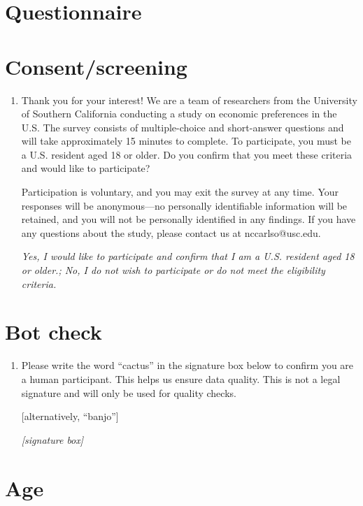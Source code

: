 \documentclass[11pt, headsepline]{article}
\begin{document}
\section*{\centering \LARGE \normalfont Questionnaire}

\section*{Consent/screening}

\begin{enumerate}
    \item Thank you for your interest! We are a team of researchers from the University of Southern California conducting a study on economic preferences in the U.S. 
    The survey consists of multiple-choice and short-answer questions and will take approximately 15 minutes to complete.
    To participate, you must be a U.S. resident aged 18 or older. Do you confirm that you meet these criteria and would like to participate?

    Participation is voluntary, and you may exit the survey at any time. Your responses will be anonymous---no personally identifiable information will be retained, and you will not be personally identified in any findings. If you have any questions about the study, please contact us at nccarlso@usc.edu.

    \textit{Yes, I would like to participate and confirm that I am a U.S. resident aged 18 or older.; No, I do not wish to participate or do not meet the eligibility criteria.}
\end{enumerate}

\section*{Bot check}

\begin{enumerate}[resume]

    \item Please write the word “cactus” in the signature box below to confirm you are a human participant. This helps us ensure data quality. This is not a legal signature and will only be used for quality checks.

    [alternatively, ``banjo'']

    \textit{[signature box]}

\end{enumerate}

\section*{Age}
\end{document}
